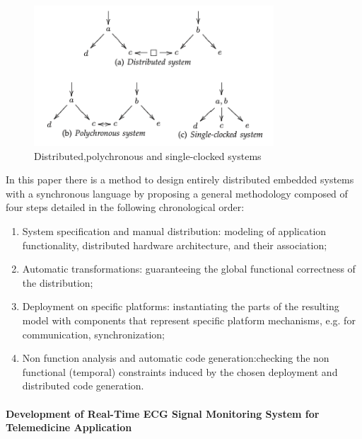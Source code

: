 \documentclass{article}
\begin{document}
\begin{figure}[htbp] 
\centering 
\includegraphics[width=0.8\textwidth]{DistributedSystem.png} 
\caption{Distributed,polychronous and single-clocked systems} 
\label{Fig.main2} 
\end{figure}

In this paper there is a method to design entirely distributed embedded systems with a synchronous language by proposing a general methodology composed of four steps detailed in the following chronological order:

\begin{enumerate}
  \item System specification and manual distribution: modeling of application functionality, distributed hardware architecture, and their association; 
  \item Automatic transformations: guaranteeing the global functional correctness of the distribution;
  \item Deployment on specific platforms: instantiating the parts of the resulting model with components that represent specific platform mechanisms, e.g. for communication, synchronization;
  \item Non function analysis and automatic code generation:checking the non functional (temporal) constraints induced by the chosen deployment and distributed code generation.
\end{enumerate}

\paragraph{Development of Real-Time ECG Signal Monitoring System for Telemedicine Application} 

\paragraph{}
\end{document}
